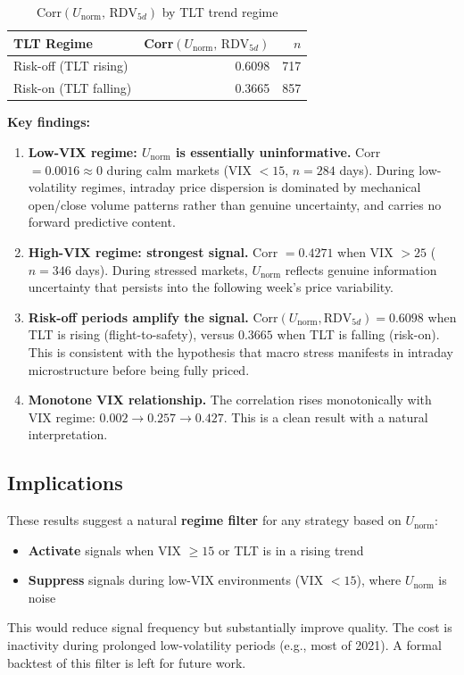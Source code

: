\documentclass[preprint,12pt]{elsarticle}
\begin{document}
\begin{table}[htbp]
\centering
\caption{Corr$(U_\mathrm{norm},\, \mathrm{RDV}_{5d})$ by TLT trend regime}
\begin{tabular}{lrr}
\toprule
TLT Regime & Corr$(U_\mathrm{norm},\, \mathrm{RDV}_{5d})$ & $n$ \\
\midrule
Risk-off (TLT rising)  & 0.6098 & 717 \\
Risk-on (TLT falling)  & 0.3665 & 857 \\
\bottomrule
\end{tabular}
\end{table}

\textbf{Key findings:}
\begin{enumerate}
    \item \textbf{Low-VIX regime: $U_\mathrm{norm}$ is essentially uninformative.} Corr $= 0.0016 \approx 0$ during calm markets (VIX $< 15$, $n = 284$ days). During low-volatility regimes, intraday price dispersion is dominated by mechanical open/close volume patterns rather than genuine uncertainty, and carries no forward predictive content.
    \item \textbf{High-VIX regime: strongest signal.} Corr $= 0.4271$ when VIX $> 25$ ($n = 346$ days). During stressed markets, $U_\mathrm{norm}$ reflects genuine information uncertainty that persists into the following week's price variability.
    \item \textbf{Risk-off periods amplify the signal.} Corr$(U_\mathrm{norm}, \mathrm{RDV}_{5d}) = 0.6098$ when TLT is rising (flight-to-safety), versus $0.3665$ when TLT is falling (risk-on). This is consistent with the hypothesis that macro stress manifests in intraday microstructure before being fully priced.
    \item \textbf{Monotone VIX relationship.} The correlation rises monotonically with VIX regime: $0.002 \to 0.257 \to 0.427$. This is a clean result with a natural interpretation.
\end{enumerate}

\subsection{Implications}

These results suggest a natural \textbf{regime filter} for any strategy based on $U_\mathrm{norm}$:
\begin{itemize}
    \item \textbf{Activate} signals when VIX $\geq 15$ or TLT is in a rising trend
    \item \textbf{Suppress} signals during low-VIX environments (VIX $< 15$), where $U_\mathrm{norm}$ is noise
\end{itemize}
This would reduce signal frequency but substantially improve quality. The cost is inactivity during prolonged low-volatility periods (e.g., most of 2021). A formal backtest of this filter is left for future work.
\end{document}

